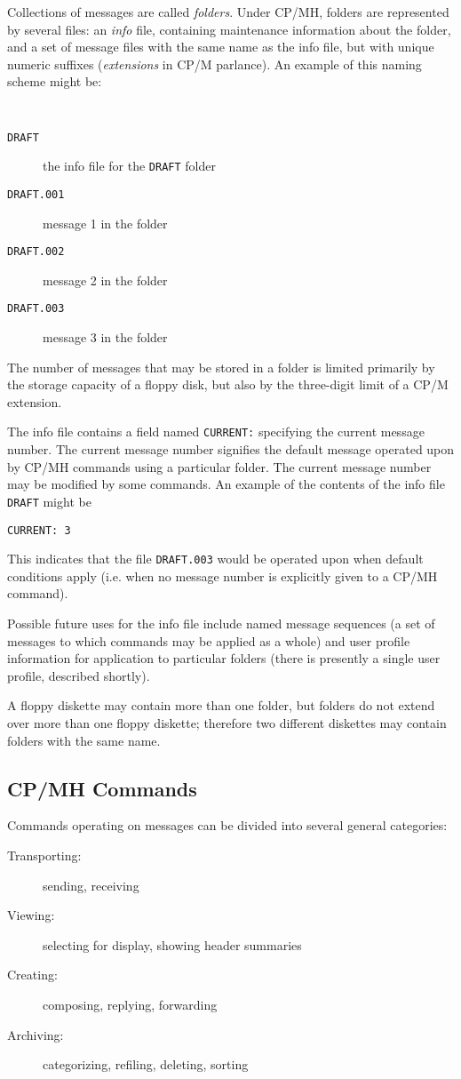 Collections of messages are called {\it folders}.  Under CP/MH,
folders are represented by several files: an {\it info} file,
containing maintenance information about the folder, and a set
of message files with the same name as the info file, but with
unique numeric suffixes ({\it extensions} in CP/M parlance).  
An example of this naming scheme might be:

{\tt
\begin{description}
\item[{\tt DRAFT}]  	{\rm the info file for the {\tt DRAFT} folder}
\item[{\tt DRAFT.001}]  {\rm message 1 in the folder}
\item[{\tt DRAFT.002}]  {\rm message 2 in the folder}
\item[{\tt DRAFT.003}]  {\rm message 3 in the folder}
\end{description}
}

The number of messages that may be stored in a folder is limited
primarily by the storage capacity of a floppy disk, but also by
the three-digit limit of a CP/M extension.  

The info file contains a field named {\tt CURRENT:} specifying the
current message number.  
The current message number signifies the default message operated upon 
by CP/MH commands using a particular folder.  
The current message number may be modified by some commands.  
An example of the contents of the info file {\tt DRAFT} might be

\begin{flushleft}
\hspace{.5in} {\tt CURRENT: 3}
\end{flushleft}

This indicates that the file {\tt DRAFT.003} would be operated upon
when default conditions apply (i.e. when no message number is
explicitly given to a CP/MH command).

Possible future uses for the info file include named message sequences
(a set of messages to which commands may be applied as a whole) and
user profile information for application to particular folders (there
is presently a single user profile, described shortly).

A floppy diskette may contain more than one folder, but folders
do not extend over more than one floppy diskette; therefore two
different diskettes may contain folders with the same name.

\subsection*	{CP/MH Commands}
Commands operating on messages can be divided into several general categories:
\medskip
\begin{description}
\item[Transporting:]	sending, receiving
\item[Viewing:]		selecting for display, showing header summaries
\item[Creating:]	composing, replying, forwarding
\item[Archiving:]	categorizing, refiling, deleting, sorting
\end{description}

